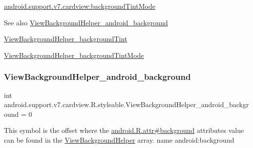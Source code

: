 {\ttfamily \hyperlink{classandroid_1_1support_1_1v7_1_1cardview_1_1R_1_1styleable_a79e46c7414583bac85ce50861d5c8ad0}{android.\+support.\+v7.\+cardview\+:background\+Tint\+Mode}}

\begin{DoxySeeAlso}{See also}
\hyperlink{classandroid_1_1support_1_1v7_1_1cardview_1_1R_1_1styleable_a7a3a9b0fb886ee19df2600f390bc2839}{View\+Background\+Helper\+\_\+android\+\_\+background} 

\hyperlink{classandroid_1_1support_1_1v7_1_1cardview_1_1R_1_1styleable_aacbc5a77ebb6f89cb3645b863dd8b7f4}{View\+Background\+Helper\+\_\+background\+Tint} 

\hyperlink{classandroid_1_1support_1_1v7_1_1cardview_1_1R_1_1styleable_a79e46c7414583bac85ce50861d5c8ad0}{View\+Background\+Helper\+\_\+background\+Tint\+Mode} 
\end{DoxySeeAlso}
\mbox{\label{classandroid_1_1support_1_1v7_1_1cardview_1_1R_1_1styleable_a7a3a9b0fb886ee19df2600f390bc2839}} 
\subsubsection{\texorpdfstring{View\+Background\+Helper\+\_\+android\+\_\+background}{ViewBackgroundHelper\_android\_background}}
{\footnotesize\ttfamily int android.\+support.\+v7.\+cardview.\+R.\+styleable.\+View\+Background\+Helper\+\_\+android\+\_\+background = 0\hspace{0.3cm}{\ttfamily [static]}}

This symbol is the offset where the \hyperlink{}{android.\+R.\+attr\#background} attribute\textquotesingle{}s value can be found in the \hyperlink{classandroid_1_1support_1_1v7_1_1cardview_1_1R_1_1styleable_a5b548c410f0942ef83e14ce4020235ca}{View\+Background\+Helper} array.  name android\+:background \mbox{\label{classandroid_1_1support_1_1v7_1_1cardview_1_1R_1_1styleable_aacbc5a77ebb6f89cb3645b863dd8b7f4}} 
